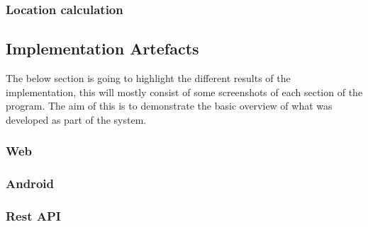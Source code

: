 \subsubsection{Location calculation}

\subsection{Implementation Artefacts}
The below section is going to highlight the different results of the implementation, this will mostly consist of some screenshots of each section of the program. The aim of this is to demonstrate the basic overview of what was developed as part of the system.

\subsubsection{Web}
\subsubsection{Android}
\subsubsection{Rest API}


